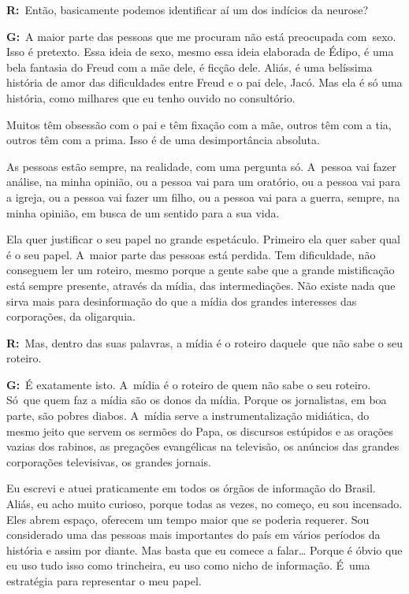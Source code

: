  

\textbf{R:}~Então, basicamente podemos identificar aí um dos indícios da
neurose?

 

\textbf{G:}~A maior parte das pessoas que me procuram não está
preocupada com\textbf{}~sexo. Isso é pretexto. Essa ideia de sexo, mesmo
essa ideia elaborada de Édipo, é uma bela fantasia do Freud com a mãe
dele, é ficção dele. Aliás, é uma belíssima história de amor das
dificuldades entre Freud e o pai dele, Jacó. Mas ela é só uma história,
como milhares que eu tenho ouvido no consultório.

 

Muitos têm obsessão com o pai e têm fixação com a mãe, outros têm com a
tia, outros têm com a prima. Isso é de uma desimportância absoluta.

 

As pessoas estão sempre, na realidade, com uma pergunta só. A~pessoa vai
fazer análise, na minha opinião, ou a pessoa vai para um oratório, ou a
pessoa vai para a igreja, ou a pessoa vai fazer um filho, ou a pessoa
vai para a guerra, sempre, na minha opinião, em busca de um sentido para
a sua vida.

 

Ela quer justificar o seu papel no grande espetáculo. Primeiro ela quer
saber qual é o seu papel. A~maior parte das pessoas está perdida. Tem
dificuldade, não conseguem ler um roteiro, mesmo porque a gente sabe que
a grande mistificação está sempre presente, através da mídia, das
intermediações. Não existe nada que sirva mais para desinformação do que
a mídia dos grandes interesses das corporações, da oligarquia.

 

\textbf{R:}~Mas, dentro das suas palavras, a mídia é o roteiro
daquele\textbf{}~que não sabe o seu roteiro.

 

\textbf{G:}~É exatamente isto. A~mídia é o roteiro de quem não sabe o
seu roteiro. Só\textbf{}~que quem faz a mídia são os donos da mídia.
Porque os jornalistas, em boa parte, são pobres diabos. A~mídia serve a
instrumentalização midiática, do mesmo jeito que servem os sermões do
Papa, os discursos estúpidos e as orações vazias dos rabinos, as
pregações evangélicas na televisão, os anúncios das grandes corporações
televisivas, os grandes jornais.

 

Eu escrevi e atuei praticamente em todos os órgãos de informação do
Brasil. Aliás, eu acho muito curioso, porque todas as vezes, no começo,
eu sou incensado. Eles abrem espaço, oferecem um tempo maior que se
poderia requerer. Sou considerado uma das pessoas mais importantes do
país em vários períodos da história e assim por diante. Mas basta que eu
comece a falar… Porque é óbvio que eu uso tudo isso como
trincheira, eu uso como nicho de informação. É~uma estratégia para
representar o meu papel.


